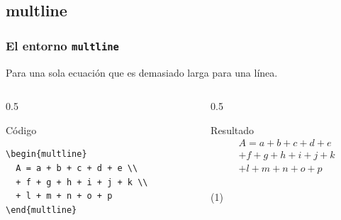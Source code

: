 \documentclass[12pt,aspectratio=169,ignorenonframetext]{ltxbeamer}
\begin{document}
\subsection{multline}
\begin{frame}[fragile]
\frametitle{El entorno \texttt{multline}}
Para una sola ecuación que es demasiado larga para una línea.

\begin{columns}
\begin{column}{0.5\textwidth}
    \begin{block}{Código}
\begin{verbatim}
\begin{multline}
  A = a + b + c + d + e \\
  + f + g + h + i + j + k \\
  + l + m + n + o + p
\end{multline}
\end{verbatim}
        \end{block}
    \end{column}

    \begin{column}{0.5\textwidth}
        \begin{exampleblock}{Resultado}
            \lmr
            \begin{multline*}
                A = a + b + c + d + e \\
                + f + g + h + i + j + k \\
                + l + m + n + o + p
            \end{multline*}\\[-1em]
            \hfill(1)
        \end{exampleblock}
    \end{column}
\end{columns}
\end{frame}
\end{document}
